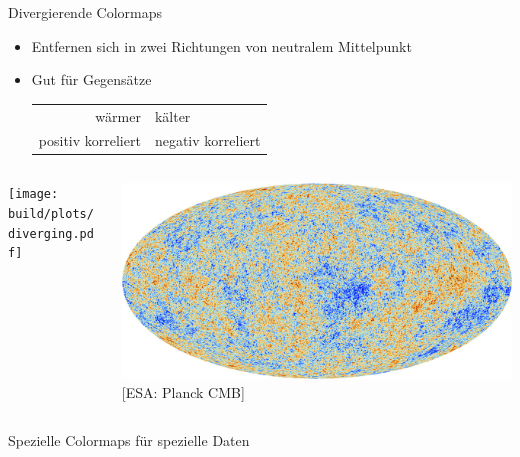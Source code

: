 \documentclass[aspectratio=1610, 9pt]{beamer}
\begin{document}
\begin{frame}[c]{Divergierende Colormaps}
  \begin{itemize}
    \item Entfernen sich in zwei Richtungen von neutralem Mittelpunkt
    \item Gut für Gegensätze \\
        \begin{tabular}{r @{${}⟷  {}$} l}
          wärmer & kälter \\
          positiv korreliert & negativ korreliert \\
        \end{tabular}
  \end{itemize} 

  \vspace{1cm}

  \begin{columns}[c, onlytextwidth]
    \begin{column}{0.4\textwidth}
      \texttt{[image: build/plots/diverging.pdf]}
    \end{column}
    \begin{column}{0.6\textwidth}
      \centering
      \includegraphics[width=\linewidth]{images/Planck_CMB.jpg} \\
      {\tiny [ESA: Planck CMB]}
    \end{column}
  \end{columns}
\end{frame}



\begin{frame}{Spezielle Colormaps für spezielle Daten}%
\end{frame}%

\end{document}
